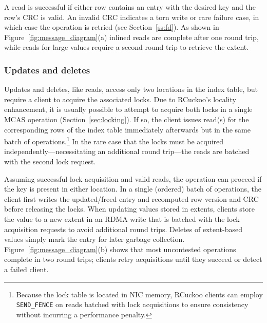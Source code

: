 A read is successful if either row contains an entry with the desired
key and the row's CRC is valid. An invalid CRC indicates a torn write
or rare failure case, in which case the operation is retried
(see Section~\ref{ss:fd}).  As shown in
Figure~\ref{fig:message_diagram}(a) inlined reads are complete after
one round trip, while reads for large values require a second round
trip to retrieve the extent.


\subsubsection{Updates and deletes}

Updates and deletes, like reads, access only two locations in the
index table, but require a client to acquire the associated locks.
Due to RCuckoo's locality enhancement, it is usually possible to
attempt to acquire both locks in a single MCAS operation
(Section~\ref{sec:locking}).  If so, the client issues read(s) for the
corresponding rows of the index table immediately afterwards but in
the same batch of operations.\footnote{Because the lock table is
located in NIC memory, RCuckoo clients can employ \texttt{SEND\_FENCE}
on reads batched with lock acquisitions to ensure consistency without
incurring a performance penalty.}  In the rare case that the locks
must be acquired independently---necessitating an additional round
trip---the reads are batched with the second lock request.

Assuming
successful lock acquisition and valid reads, the operation can proceed
if the key is present in either location.  In a single (ordered) batch
of operations, the client first writes the updated/freed entry and
recomputed row version and CRC before releasing the locks. When
updating values stored in extents, clients store the value to a new
extent in an RDMA write that is batched with the lock acquisition
requests to avoid additional round trips.  Deletes of extent-based
values simply mark the entry for later garbage collection.
Figure~\ref{fig:message_diagram}(b) shows that most uncontested operations
complete in two round trips; clients retry acquisitions until they succeed or detect a failed client.



